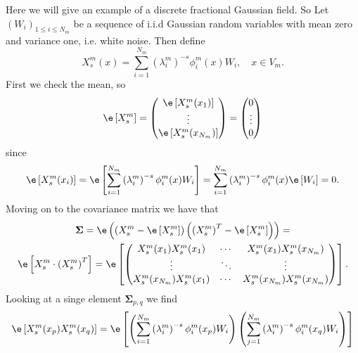 \begin{example}\label{OneToSimulate}
	Here we will give an example of a discrete fractional Gaussian field. So Let $(W_i)_{1\leq i \leq N_m}$ be a sequence of i.i.d Gaussian random variables with mean zero and variance one, i.e. white noise. Then define
	\begin{equation}
		X_{s}^{m}(x) = \sum_{i=1}^{N_m}\left(\lambda_i^{m}\right)^{-s}\phi^{m}_{i}(x)W_i, \quad x \in V_m.
	\end{equation}
	First we check the mean, so
	\begin{equation}
		\e \left[X_s^{m}\right] = \begin{pmatrix}
			\e\left[X_s^{m}(x_1)\right] \\
			\vdots \\
			\e \left[X_s^{m}(x_{N_m})\right]
		\end{pmatrix} = \begin{pmatrix}
		0 \\
		\vdots \\
		0
		\end{pmatrix}
	\end{equation}
	since
	\begin{equation}
		\e \left[X_s^{m}(x_i)\right] = \e \left[\sum_{i=1}^{N_m}\left(\lambda_i^{m}\right)^{-s}\phi^{m}_{i}(x)W_i\right] = \sum_{i = 1}^{N_m} \left(\lambda_i^{m}\right)^{-s}\phi^{m}_{i}(x) \e \left[W_i\right] = 0.
	\end{equation}
	Moving on to the covariance matrix we have that
	\begin{multline}
		\mathbf{\Sigma} = \e \left( \left(X_s^{m} - \e \left[X_s^{m}\right] \right)\left(\left(X_s^{m}\right)^{T} - \e \left[X_s^{m}\right] \right)\right) = \\
		\e \left[X_s^{m} \cdot \left(X_s^{m}\right)^{T}\right] = \e \left[\begin{pmatrix}
			X_s^{m}(x_1)X_s^{m}(x_1) & \cdots  & X_s^{m}(x_1)X_s^{m}(x_{N_m}) \\
			\vdots & \ddots  & \vdots \\
			X_s^{m}(x_{N_m})X_s^{m}(x_1)  & \cdots & X_s^{m}(x_{N_m})X_s^{m}(x_{N_m}) 
		\end{pmatrix}\right].
	\end{multline}
	Looking at a singe element $\mathbf{\Sigma}_{p,q}$ we find 
	\begin{align}
		\e \left[X_{s}^{m}(x_p)X_s^{m}(x_q)\right] &= \e \left[\left(\sum_{i=1}^{N_m}\left(\lambda_i^{m}\right)^{-s}\phi^{m}_{i}(x_p)W_i\right) \left(\sum_{j=1}^{N_m}\left(\lambda_i^{m}\right)^{-s}\phi^{m}_{i}(x_q)W_i\right)\right]\\ 

\end{align}
\end{example}
